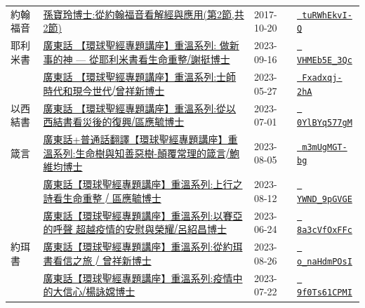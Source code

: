 \documentclass{book}
\begin{document}
{\begin{xltabular}{\textwidth}{|p{0.15\textwidth} p{0.6\textwidth}|p{0.07\textwidth} p{0.1\textwidth}|}
約翰福音   & \hyperref[sec:tuRWhEkvI_Q]{孫寶玲博士:從約翰福音看解經與應用(第2節,共2節)} & 2017-10-20 & \href{https://youtube.com/watch?v=tuRWhEkvI-Q}{\texttt{ tuRWhEkvI-Q}} \\
耶利米書   & \hyperref[sec:VHMEb5E_3Qc]{廣東話 【環球聖經專題講座】重溫系列: 做新事的神 — 從耶利米書看生命重整⧸謝挺博士} & 2023-09-16 & \href{https://youtube.com/watch?v=VHMEb5E_3Qc}{\texttt{ VHMEb5E\_3Qc}} \\
    & \hyperref[sec:Fxadxqj_2hA]{廣東話 【環球聖經專題講座】重溫系列:士師時代和現今世代⧸曾祥新博士} & 2023-05-27 & \href{https://youtube.com/watch?v=Fxadxqj-2hA}{\texttt{ Fxadxqj-2hA}} \\
以西結書   & \hyperref[sec:0YlBYq577gM]{廣東話 【環球聖經專題講座】重溫系列:從以西結書看災後的復興⧸區應毓博士} & 2023-07-01 & \href{https://youtube.com/watch?v=0YlBYq577gM}{\texttt{ 0YlBYq577gM}} \\
箴言   & \hyperref[sec:m3mUgMGT_bg]{廣東話+普通話翻譯【環球聖經專題講座】重溫系列:生命樹與知善惡樹-顛覆常理的箴言⧸鮑維均博士} & 2023-08-05 & \href{https://youtube.com/watch?v=m3mUgMGT-bg}{\texttt{ m3mUgMGT-bg}} \\
    & \hyperref[sec:YWND_9pGVGE]{廣東話【環球聖經專題講座】重溫系列:上行之詩看生命重整 ⧸ 區應毓博士} & 2023-08-12 & \href{https://youtube.com/watch?v=YWND_9pGVGE}{\texttt{ YWND\_9pGVGE}} \\
    & \hyperref[sec:8a3cVfOxFFc]{廣東話【環球聖經專題講座】重溫系列:以賽亞的呼聲 超越疫情的安慰與榮耀⧸呂紹昌博士} & 2023-06-24 & \href{https://youtube.com/watch?v=8a3cVfOxFFc}{\texttt{ 8a3cVfOxFFc}} \\
約珥書   & \hyperref[sec:o_naHdmPOsI]{廣東話【環球聖經專題講座】重溫系列:從約珥書看信之旅 ⧸ 曾祥新博士} & 2023-08-26 & \href{https://youtube.com/watch?v=o_naHdmPOsI}{\texttt{ o\_naHdmPOsI}} \\
    & \hyperref[sec:9f0Ts61CPMI]{廣東話【環球聖經專題講座】重溫系列:疫情中的大信心⧸楊詠嫦博士} & 2023-07-22 & \href{https://youtube.com/watch?v=9f0Ts61CPMI}{\texttt{ 9f0Ts61CPMI}} \\
\end{xltabular}
}
\newpage
\end{document}
